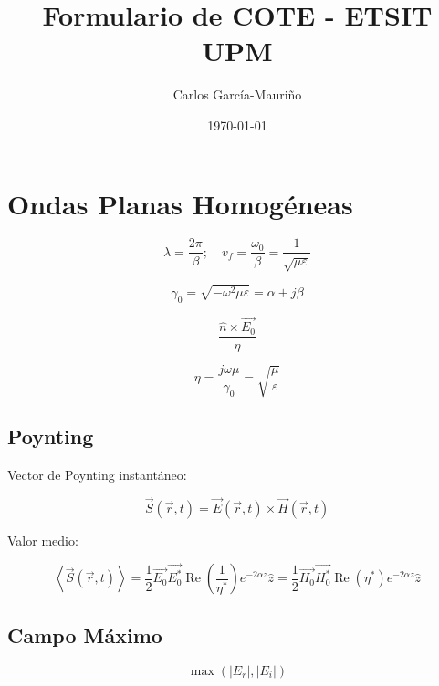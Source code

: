\documentclass[12pt,a4paper]{article}
\title{Formulario de COTE - ETSIT UPM}
\author{Carlos García-Mauriño}
\date{\today}
\begin{document}
\maketitle

\twocolumn

\section{Ondas Planas Homogéneas}
\label{sec:ondas_planas_homogeneas}

\[ \lambda = \frac{2 \pi}{\beta}; \quad v_f = \frac{\omega_0}{\beta}  =
\frac{1}{\sqrt{\mu \varepsilon}} \]

\[ \gamma_0 = \sqrt{-\omega^2 \mu \varepsilon} = \alpha + j \beta \]

\[ \frac{\hat{n} \times \vec{E_0}}{\eta} \]

\[ \eta = \frac{j \omega \mu}{\gamma_0} = \sqrt{\frac{\mu}{\varepsilon}} \]

\subsection{Poynting}
\label{sub:poynting}

Vector de Poynting instantáneo:

\[ \vec{S} ( \vec{r}, t ) = \vec{E} ( \vec{r}, t ) \times \vec{H} ( \vec{r}, t
) \]

Valor medio:

\[ \left< \vec{S} ( \vec{r}, t ) \right> = \frac{1}{2} \vec{E_0} \vec{E_0^*}
\operatorname{Re}\left( \frac{1}{\eta^*} \right) e^{-2 \alpha z} \hat{z} = 
\frac{1}{2} \vec{H_0} \vec{H_0^*} \operatorname{Re}\left( \eta^* \right) e^{-2 \alpha z} \hat{z} \]

\subsection{Campo Máximo}
\label{sub:campo_maximo}

\[ \max{\left(|E_r|, |E_i|\right)} \]
\end{document}
